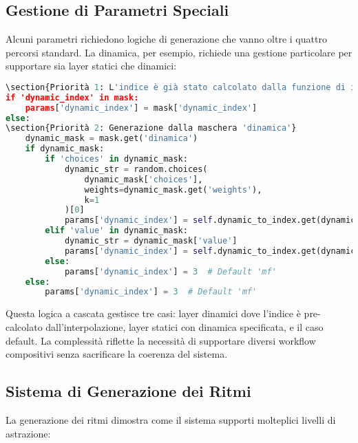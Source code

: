 \subsection{Gestione di Parametri Speciali}
Alcuni parametri richiedono logiche di generazione che vanno oltre i quattro percorsi standard. La dinamica, per esempio, richiede una gestione particolare per supportare sia layer statici che dinamici:

\begin{lstlisting}[language=Python]
\section{Priorità 1: L'indice è già stato calcolato dalla funzione di interpolazione}
if 'dynamic_index' in mask:
    params['dynamic_index'] = mask['dynamic_index']
else:
\section{Priorità 2: Generazione dalla maschera 'dinamica'}
    dynamic_mask = mask.get('dinamica')
    if dynamic_mask:
        if 'choices' in dynamic_mask:
            dynamic_str = random.choices(
                dynamic_mask['choices'], 
                weights=dynamic_mask.get('weights'), 
                k=1
            )[0]
            params['dynamic_index'] = self.dynamic_to_index.get(dynamic_str, 3)
        elif 'value' in dynamic_mask:
            dynamic_str = dynamic_mask['value']
            params['dynamic_index'] = self.dynamic_to_index.get(dynamic_str, 3)
        else:
            params['dynamic_index'] = 3  # Default 'mf'
    else:
        params['dynamic_index'] = 3  # Default 'mf'
\end{lstlisting}

Questa logica a cascata gestisce tre casi: layer dinamici dove l'indice è pre-calcolato dall'interpolazione, layer statici con dinamica specificata, e il caso default. La complessità riflette la necessità di supportare diversi workflow compositivi senza sacrificare la coerenza del sistema.
\subsection{Sistema di Generazione dei Ritmi}
La generazione dei ritmi dimostra come il sistema supporti molteplici livelli di astrazione:

